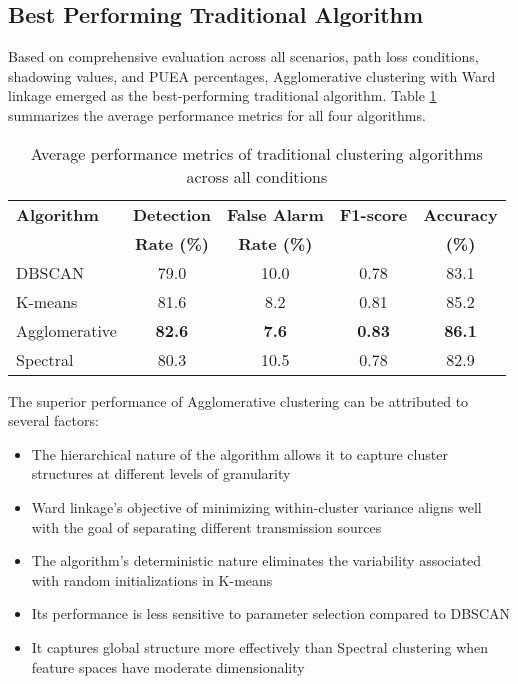 \subsection{Best Performing Traditional Algorithm}

Based on comprehensive evaluation across all scenarios, path loss conditions, shadowing values, and PUEA percentages, Agglomerative clustering with Ward linkage emerged as the best-performing traditional algorithm. Table \ref{tab:traditional_performance} summarizes the average performance metrics for all four algorithms.

\begin{table}[htbp]
    \centering
    \caption{Average performance metrics of traditional clustering algorithms across all conditions}
    \label{tab:traditional_performance}
    \begin{tabular}{lcccc}
        \toprule
        \textbf{Algorithm} & \textbf{Detection} & \textbf{False Alarm} & \textbf{F1-score} & \textbf{Accuracy} \\
        & \textbf{Rate (\%)} & \textbf{Rate (\%)} & & \textbf{(\%)} \\
        \midrule
        DBSCAN & 79.0 & 10.0 & 0.78 & 83.1 \\
        K-means & 81.6 & 8.2 & 0.81 & 85.2 \\
        Agglomerative & \textbf{82.6} & \textbf{7.6} & \textbf{0.83} & \textbf{86.1} \\
        Spectral & 80.3 & 10.5 & 0.78 & 82.9 \\
        \bottomrule
    \end{tabular}
\end{table}

The superior performance of Agglomerative clustering can be attributed to several factors:

\begin{itemize}
    \item The hierarchical nature of the algorithm allows it to capture cluster structures at different levels of granularity
    
    \item Ward linkage's objective of minimizing within-cluster variance aligns well with the goal of separating different transmission sources
    
    \item The algorithm's deterministic nature eliminates the variability associated with random initializations in K-means
    
    \item Its performance is less sensitive to parameter selection compared to DBSCAN
    
    \item It captures global structure more effectively than Spectral clustering when feature spaces have moderate dimensionality
\end{itemize}

